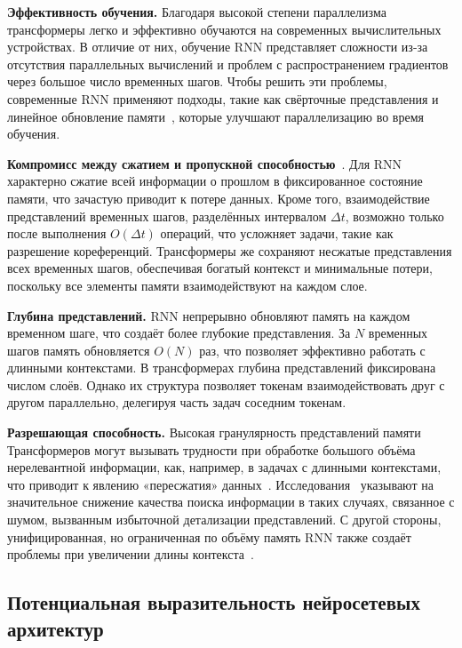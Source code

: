 \textbf{Эффективность обучения.}
Благодаря высокой степени параллелизма трансформеры легко и эффективно обучаются на современных вычислительных устройствах. В отличие от них, обучение RNN представляет сложности из-за отсутствия параллельных вычислений и проблем с распространением градиентов через большое число временных шагов. Чтобы решить эти проблемы, современные RNN применяют подходы, такие как свёрточные представления и линейное обновление памяти~\cite{gu2020hippo, gu2021s4, gu2023mamba, peng2023rwkv}, которые улучшают параллелизацию во время обучения.  

\textbf{Компромисс между сжатием и пропускной способностью}~\cite{arora2024simple}.  
Для RNN характерно сжатие всей информации о прошлом в фиксированное состояние памяти, что зачастую приводит к потере данных. Кроме того, взаимодействие представлений временных шагов, разделённых интервалом $\Delta t$, возможно только после выполнения $O(\Delta t)$ операций, что усложняет задачи, такие как разрешение кореференций. Трансформеры же сохраняют несжатые представления всех временных шагов, обеспечивая богатый контекст и минимальные потери, поскольку все элементы памяти взаимодействуют на каждом слое.  

\textbf{Глубина представлений.}
RNN непрерывно обновляют память на каждом временном шаге, что создаёт более глубокие представления. За $N$ временных шагов память обновляется $O(N)$ раз, что позволяет эффективно работать с длинными контекстами. В трансформерах глубина представлений фиксирована числом слоёв. Однако их структура позволяет токенам взаимодействовать друг с другом параллельно, делегируя часть задач соседним токенам.  

\textbf{Разрешающая способность.}
Высокая гранулярность представлений памяти Трансформеров могут вызывать трудности при обработке большого объёма нерелевантной информации, как, например, в задачах с длинными контекстами, что приводит к явлению «пересжатия» данных~\cite{barbero2024transformers}. Исследования~\cite{liu2023lost, hsieh2024ruler, kuratov2024babilong} указывают на значительное снижение качества поиска информации в таких случаях, связанное с шумом, вызванным избыточной детализации представлений. С другой стороны, унифицированная, но ограниченная по объёму память RNN также создаёт проблемы при увеличении длины контекста~\cite{jelassi2024repeat}.  


\subsection{Потенциальная выразительность нейросетевых архитектур}

